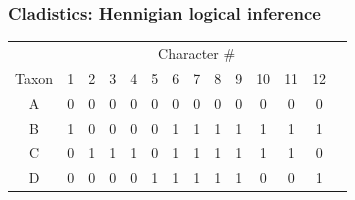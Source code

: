 \begin{frame}
    \frametitle{Cladistics: Hennigian logical inference}
\begin{table}[htdp]
\begin{center}
\begin{tabular}{|c|c|c|c|c|c|c|c|c|c|c|c|c|c|}
\hline 
 & \multicolumn{12}{c|}{Character \#} \\ 
Taxon &\color{blue} 1 & \color{blue} 2 & \color{blue} 3 & \color{blue} 4 & \color{blue} 5 & \color{green} 6 & \color{green} 7 & \color{green} 8 & \color{green} 9 & \color{red} 10 & \color{red} 11 &  \color{red} 12   \\ 
\hline 
A & \color{blue} 0 & \color{blue} 0 & \color{blue} 0 & \color{blue} 0 & \color{blue} 0 & \color{green} 0 & \color{green} 0 & \color{green} 0 & \color{green} 0 & \color{red} 0 & \color{red} 0 & \color{red} 0  \\
B & \color{blue} 1 & \color{blue} 0 & \color{blue} 0 & \color{blue} 0 & \color{blue} 0 & \color{green} 1 & \color{green} 1 & \color{green} 1 & \color{green} 1 & \color{red} 1 & \color{red} 1 & \color{red} 1 \\
C &    \color{blue} 0 & \color{blue} 1 & \color{blue} 1 & \color{blue} 1 & \color{blue} 0 & \color{green} 1 & \color{green} 1 & \color{green} 1 & \color{green} 1 & \color{red} 1 & \color{red} 1 & \color{red} 0\\
D &    \color{blue} 0 & \color{blue} 0 & \color{blue} 0 & \color{blue} 0 & \color{blue} 1 & \color{green} 1 & \color{green} 1 & \color{green} 1 & \color{green} 1 & \color{red} 0 & \color{red} 0 & \color{red} 1\\
\hline 
\end{tabular}
\end{center}
\end{table}
\end{frame}

